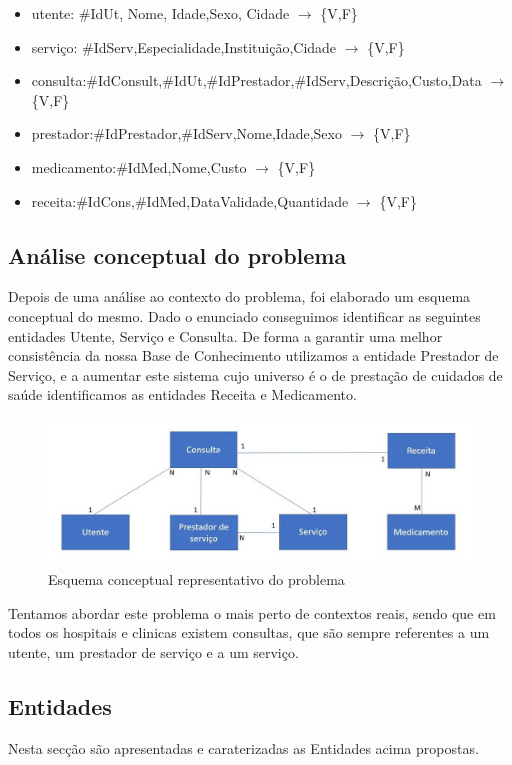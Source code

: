 \documentclass[25pt]{article}
\begin{document}
\begin{itemize}
  \item utente: \#IdUt, Nome, Idade,Sexo, Cidade $\to$ \{V,F\}
  \item serviço: \#IdServ,Especialidade,Instituiç\~ao,Cidade $\to$ \{V,F\}
  \item consulta:\#IdConsult,\#IdUt,\#IdPrestador,\#IdServ,Descrição,Custo,Data $\to$ \{V,F\}
  \item prestador:\#IdPrestador,\#IdServ,Nome,Idade,Sexo $\to$ \{V,F\}
  \item medicamento:\#IdMed,Nome,Custo $\to$ \{V,F\}
  \item receita:\#IdCons,\#IdMed,DataValidade,Quantidade $\to$ \{V,F\}
  \end{itemize}



\subsection{Análise conceptual do problema}
Depois de uma análise ao contexto do problema, foi elaborado um esquema conceptual do mesmo. Dado o enunciado conseguimos identificar as
seguintes entidades Utente, Serviço e Consulta. De forma a garantir uma melhor consistência da nossa Base de Conhecimento utilizamos a entidade Prestador de Serviço, e a aumentar
este sistema cujo universo é o de prestação de cuidados de saúde identificamos as entidades Receita e Medicamento.
\begin{figure}[H]
\centering\includegraphics[scale=0.35]{esquema}
\caption{\label{fig:controller}Esquema conceptual representativo do problema}
\end{figure}
Tentamos abordar este problema o mais perto de contextos reais, sendo que em todos os hospitais e clinicas existem consultas, que são sempre
referentes a um utente, um prestador de serviço e a um serviço.
\subsection{Entidades}
Nesta secção são apresentadas e caraterizadas as Entidades acima propostas.
\end{document}
